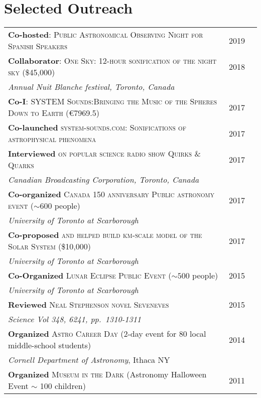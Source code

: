 \documentclass[10pt]{article} %
\begin{document}

\section{Selected Outreach}

\begin{tabular}{l>{\hfill}p{1.1cm}r}
{\bf Co-hosted}: \textsc{Public Astronomical Observing Night for Spanish Speakers} & 2019 \\
{\bf Collaborator}: \textsc{One Sky: 12-hour sonification of the night sky}  \footnotesize(\$45,000)\normalsize & 2018 \\
{\it Annual Nuit Blanche festival, Toronto, Canada} \\
{\bf Co-I}: \textsc{SYSTEM Sounds:Bringing the Music of the Spheres Down to Earth} \footnotesize(\euro7969.5)\normalsize & 2017 \\
{\bf Co-launched} \textsc{system-sounds.com: Sonifications of  astrophysical phenomena} & 2017 \\
{\bf Interviewed} \textsc{on popular science radio show Quirks \& Quarks} & 2017 \\
{\it Canadian Broadcasting Corporation, Toronto, Canada} \\
{\bf Co-organized} \textsc{Canada 150 anniversary Public astronomy event} ($\sim 600$ people) & 2017 \\
{\it University of Toronto at Scarborough} \\
{\bf Co-proposed} \textsc{and helped build km-scale model of the Solar System} \footnotesize(\$10,000)\normalsize & 2017 \\
{\it University of Toronto at Scarborough} \\
{\bf Co-Organized} \textsc{Lunar Eclipse Public Event} ($\sim 500$ people) & 2015\\
{\it University of Toronto at Scarborough} \\
{\bf Reviewed} \textsc{Neal Stephenson novel Seveneves} & 2015\\
{\it Science Vol 348, 6241, pp.~1310-1311} \\
{\bf Organized} \textsc{Astro Career Day} (2-day event for 80 local middle-school students) & 2014\\
{\it Cornell Department of Astronomy}, Ithaca NY \\
{\bf Organized} \textsc{Museum in the Dark} (Astronomy Halloween Event $\sim$ 100 children) & 2011\\

\end{tabular}
\end{document}
